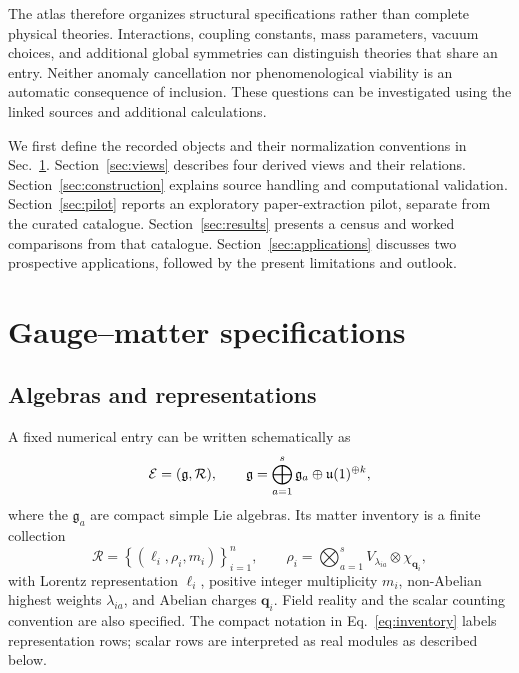 The atlas therefore organizes structural specifications rather than complete physical theories. Interactions, coupling constants, mass parameters, vacuum choices, and additional global symmetries can distinguish theories that share an entry. Neither anomaly cancellation nor phenomenological viability is an automatic consequence of inclusion. These questions can be investigated using the linked sources and additional calculations.

We first define the recorded objects and their normalization conventions in Sec.~\ref{sec:objects}. Section~\ref{sec:views} describes four derived views and their relations. Section~\ref{sec:construction} explains source handling and computational validation. Section~\ref{sec:pilot} reports an exploratory paper-extraction pilot, separate from the curated catalogue. Section~\ref{sec:results} presents a census and worked comparisons from that catalogue. Section~\ref{sec:applications} discusses two prospective applications, followed by the present limitations and outlook.

\section{Gauge--matter specifications}
\label{sec:objects}

\subsection{Algebras and representations}

A fixed numerical entry can be written schematically as
\begin{equation}
\mathcal{E}=(\mathfrak{g},\mathcal{R}),\qquad
\mathfrak{g}=\bigoplus_{a=1}^{s}\mathfrak{g}_a\oplus\mathfrak{u}(1)^{\oplus k},
\label{eq:entry}
\end{equation}
where the $\mathfrak{g}_a$ are compact simple Lie algebras. Its matter inventory is a finite collection
\begin{equation}
\mathcal{R}=\left\{\left(\ell_i,\rho_i,m_i\right)\right\}_{i=1}^{n},\qquad
\rho_i=\bigotimes_{a=1}^{s}V_{\lambda_{ia}}\otimes\chi_{\mathbf q_i},
\label{eq:inventory}
\end{equation}
with Lorentz representation $\ell_i$, positive integer multiplicity $m_i$, non-Abelian highest weights $\lambda_{ia}$, and Abelian charges $\mathbf q_i$. Field reality and the scalar counting convention are also specified. The compact notation in Eq.~\eqref{eq:inventory} labels representation rows; scalar rows are interpreted as real modules as described below.

